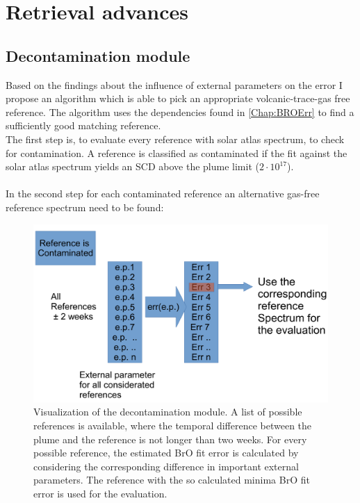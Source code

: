 \documentclass  [
  paper    = a4,
  BCOR     = 10mm,
  twoside,
  fontsize = 12pt,
  fleqn,
  toc      = bibnumbered,
  toc      = listofnumbered,
  numbers  = noendperiod,
  headings = normal,
  listof   = leveldown,
  version  = 3.03
]                                       {scrreprt}
\begin{document}
	\part{Retrieval advances}
\chapter{Decontamination module \label{chapt:contbased}}

	Based on the findings about the influence of external parameters on the  error I propose an algorithm which is able to pick an appropriate volcanic-trace-gas free reference. The algorithm uses the dependencies found in \cref{Chap:BROErr} to find a sufficiently good matching reference.\\ 
	The first step is, to evaluate every reference with solar atlas spectrum, to check for contamination. A reference is classified as contaminated if the fit against the solar atlas spectrum yields an  SCD above the plume limit ($2\cdot 10^{17}$).\\
	\\
	In the second step for each contaminated reference an alternative gas-free reference spectrum need to be found:
	\begin{figure}
		\centering
		\includegraphics[width=0.7\linewidth]{Bilder/Cont}
		\caption[Visualization of the decontamination module.]{Visualization of the decontamination module. A list of possible references is available, where the temporal difference between the plume and the reference is not longer than two weeks. For every possible reference, the estimated BrO fit error is calculated by considering the corresponding difference in important external parameters. The reference with the so calculated minima BrO fit error is used for the evaluation.}
		\label{fig:Cont}
	\end{figure}
\end{document}

